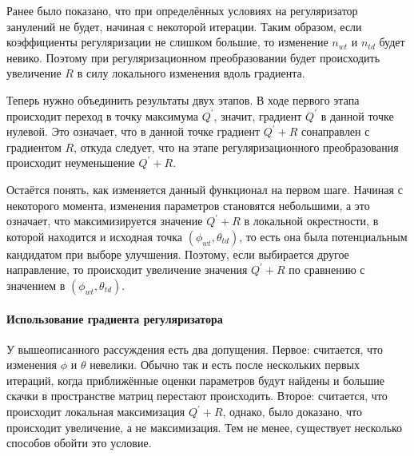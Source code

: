 \documentclass[12pt, twoside]{article}
\begin{document}
Ранее было показано, что при определённых условиях на регуляризатор занулений не будет, начиная с некоторой итерации. Таким образом, если коэффициенты регуляризации не слишком большие, то изменение $n_{wt}$ и $n_{td}$ будет невико. Поэтому при регуляризационном преобразовании будет происходить увеличение $R$ в силу локального изменения вдоль градиента.

Теперь нужно объединить результаты двух этапов. В ходе первого этапа происходит переход в точку максимума $Q^{\prime}$, значит, градиент $Q^{\prime}$ в данной точке нулевой. Это означает, что в данной точке градиент $Q^{\prime} +  R$ сонаправлен с градиентом $R$, откуда следует, что на этапе регуляризационного преобразования происходит неуменьшение $Q^{\prime} +  R$. 

Остаётся понять, как изменяется данный функционал на первом шаге. Начиная с некоторого момента, изменения параметров становятся небольшими, а это означает, что максимизируется значение $Q^{\prime} +  R$ в локальной окрестности, в которой находится и исходная точка $(\phi_{wt}, \theta_{td})$, то есть она была потенциальным кандидатом при выборе улучшения. Поэтому, если выбирается другое направление, то происходит увеличение значения $Q^{\prime} + R$ по сравнению с значением в $(\phi_{wt}, \theta_{td})$.

\paragraph{Использование градиента регуляризатора}
\label{subsec:gradientuse}
У вышеописанного рассуждения есть два допущения. Первое: считается, что изменения $\phi$ и $\theta$ невелики. Обычно так и есть после нескольких первых итераций, когда приближённые оценки параметров будут найдены и большие скачки в пространстве матриц перестают происходить. Второе: считается, что происходит локальная максимизация $Q^{\prime} + R$, однако, было доказано, что происходит увеличение, а не максимизация. Тем не менее, существует несколько способов обойти это условие. 
\end{document}
